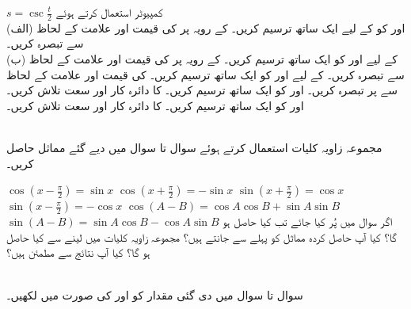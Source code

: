 $s=\csc \tfrac{t}{2}$
کمپیوٹر استعمال کرتے ہوئے\\
 (الف)\quad
   اور  کو  کے لیے ایک ساتھ ترسیم کریں۔ کے رویہ  پر  کی قیمت اور علامت کے لحاظ سے تبصرہ کریں۔\\
(ب)\quad
   کے لیے  اور  کو ایک ساتھ ترسیم کریں۔  کے رویہ پر   کی قیمت اور علامت کے لحاظ سے تبصرہ کریں۔
 کے لیے  اور  کو ایک ساتھ ترسیم کریں۔ کی قیمت اور علامت کے لحاظ سے  پر تبصرہ کریں۔
 اور  کو ایک ساتھ ترسیم کریں۔ کا دائرہ کار اور سعت تلاش کریں۔
 اور  کو ایک ساتھ ترسیم کریں۔ کا دائرہ کار اور سعت تلاش کریں۔

\\

مجموعہ زاویہ کلیات استعمال کرتے ہوئے سوال  تا سوال  میں دیے گئے مماثل حاصل کریں۔

$\cos (x-\tfrac{\pi}{2})=\sin x$
$\cos(x+\tfrac{\pi}{2})=-\sin x$
$\sin(x+\tfrac{\pi}{2})=\cos x$
$\sin(x-\tfrac{\pi}{2})=-\cos x$
$\cos(A-B)=\cos A\cos B+\sin A\sin B$
$\sin(A-B)=\sin A\cos B-\cos A\sin B$
اگر سوال  میں  پُر کیا جائے تب کیا حاصل ہو گا؟ کیا آپ حاصل کردہ مماثل کو پہلے سے جانتے ہیں؟ 
مجموعہ زاویہ کلیات میں  لینے سے کیا حاصل ہو گا؟ کیا آپ نتائج سے مطمئن ہیں؟

\\
سوال  تا سوال  میں دی گئی مقدار کو  اور  کی صورت میں لکھیں۔

